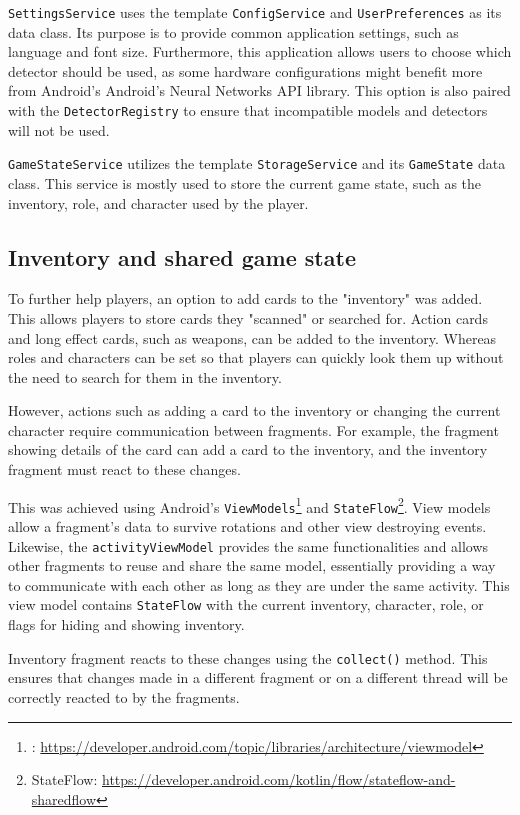 \texttt{SettingsService} uses the template \texttt{ConfigService} and \texttt{UserPreferences} as its data class. Its purpose is to provide common application settings, such as language and font size. Furthermore, this application allows users to choose which detector should be used, as some hardware configurations might benefit more from Android's Android's Neural Networks API library. This option is also paired with the \texttt{DetectorRegistry} to ensure that incompatible models and detectors will not be used.

\texttt{GameStateService} utilizes the template \texttt{StorageService} and its \texttt{GameState} data class. This service is mostly used to store the current game state, such as the inventory, role, and character used by the player.

\subsection{Inventory and shared game state }
To further help players, an option to add cards to the "inventory" was added. This allows players to store cards they "scanned" or searched for. Action cards and long effect cards, such as weapons, can be added to the inventory. Whereas roles and characters can be set so that players can quickly look them up without the need to search for them in the inventory.

However, actions such as adding a card to the inventory or changing the current character require communication between fragments. For example, the fragment showing details of the card can add a card to the inventory, and the inventory fragment must react to these changes. 

This was achieved using Android's \texttt{ViewModels}\footnote{: \url{https://developer.android.com/topic/libraries/architecture/viewmodel}} and \texttt{StateFlow}\footnote{StateFlow: \url{https://developer.android.com/kotlin/flow/stateflow-and-sharedflow}}. View models allow a fragment's data to survive rotations and other view destroying events. Likewise, the \texttt{activityViewModel} provides the same functionalities and allows other fragments to reuse and share the same model, essentially providing a way to communicate with each other as long as they are under the same activity. This view model contains \texttt{StateFlow} with the current inventory, character, role, or flags for hiding and showing inventory. 

Inventory fragment reacts to these changes using the \texttt{collect()} method. This ensures that changes made in a different fragment or on a different thread will be correctly reacted to by the fragments.

